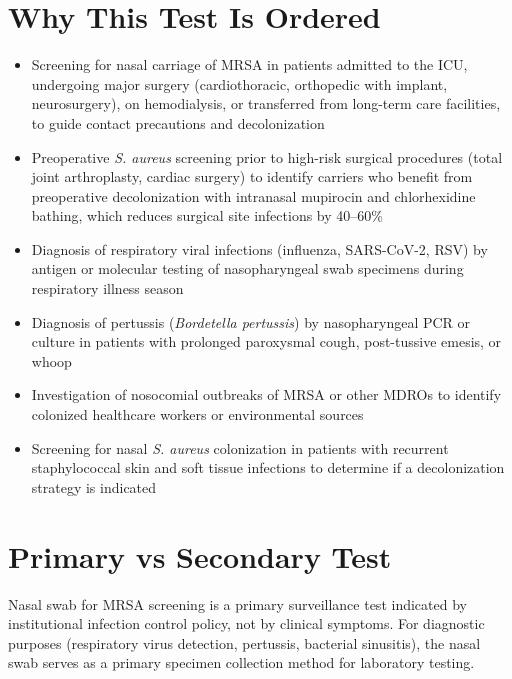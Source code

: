 \section*{Why This Test Is Ordered}
\begin{itemize}
  \item Screening for nasal carriage of MRSA in patients admitted to the ICU, undergoing major surgery (cardiothoracic, orthopedic with implant, neurosurgery), on hemodialysis, or transferred from long-term care facilities, to guide contact precautions and decolonization \cite{safdar2006effectiveness}
  \item Preoperative \textit{S. aureus} screening prior to high-risk surgical procedures (total joint arthroplasty, cardiac surgery) to identify carriers who benefit from preoperative decolonization with intranasal mupirocin and chlorhexidine bathing, which reduces surgical site infections by 40--60\% \cite{bode2010preventing}
  \item Diagnosis of respiratory viral infections (influenza, SARS-CoV-2, RSV) by antigen or molecular testing of nasopharyngeal swab specimens during respiratory illness season
  \item Diagnosis of pertussis (\textit{Bordetella pertussis}) by nasopharyngeal PCR or culture in patients with prolonged paroxysmal cough, post-tussive emesis, or whoop
  \item Investigation of nosocomial outbreaks of MRSA or other MDROs to identify colonized healthcare workers or environmental sources
  \item Screening for nasal \textit{S. aureus} colonization in patients with recurrent staphylococcal skin and soft tissue infections to determine if a decolonization strategy is indicated
\end{itemize}

\section*{Primary vs Secondary Test}
Nasal swab for MRSA screening is a primary surveillance test indicated by institutional infection control policy, not by clinical symptoms. For diagnostic purposes (respiratory virus detection, pertussis, bacterial sinusitis), the nasal swab serves as a primary specimen collection method for laboratory testing.

